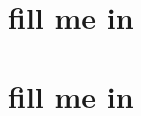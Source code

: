 \documentclass[10pt]{article}
\begin{document}


\maketitle


\section{fill me in}



\newpage
\section{fill me in}



\end{document}
